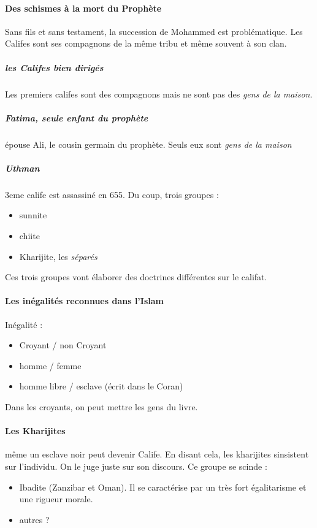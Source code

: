 \paragraph{Des schismes à la mort du Prophète} Sans fils et sans testament, la succession de Mohammed est problématique. Les Califes sont ses compagnons de la même tribu et même souvent à son clan. 

\subparagraph{les Califes bien dirigés} Les premiers califes sont des compagnons mais ne sont pas des \textit{ gens de la maison}.
 
\subparagraph{Fatima, seule enfant du prophète} épouse Ali, le cousin germain du prophète. Seuls eux sont \textit{gens de la maison}

\subparagraph{Uthman} 3eme calife est assassiné en 655. Du coup, trois groupes : 
\begin{itemize}
\item sunnite
\item chiite
\item Kharijite, les \textit{séparés}
\end{itemize}

Ces trois groupes vont élaborer des doctrines différentes sur le califat.

\paragraph{Les inégalités reconnues dans l'Islam}
Inégalité : 
\begin{itemize}
\item Croyant / non Croyant
\item homme / femme
\item homme libre / esclave (écrit dans le Coran)
\end{itemize}
Dans les croyants, on peut mettre les gens du livre. 


\paragraph{Les Kharijites} même un esclave noir peut devenir Calife. En disant cela, les kharijites sinsistent sur l'individu. On le juge juste sur son discours. 
Ce groupe se scinde : 
\begin{itemize}
\item Ibadite (Zanzibar et Oman). Il se caractérise par un très fort égalitarisme et une rigueur morale.
\item autres ? 
\end{itemize}

